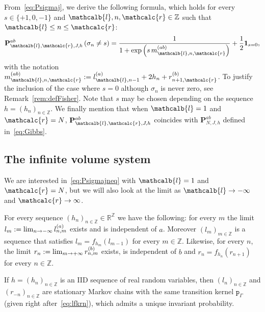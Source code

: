 \documentclass[AHL,Unicode,longabstracts,published]{cedram}
\newcommand{\ind}{\mathbf{1}}
\newcommand{\pp}{\mathtt{p}_\gG}
\newcommand{\bP}{\mathbf{P}}
\newcommand{\bbR}{\mathbb{R}}
\newcommand{\bbZ}{\mathbb{Z}}
\newcommand{\gG}{\Gamma}
\newcommand{\gs}{\sigma}
\renewcommand{\ell}{\mathcalb{l}}
\newcommand{\err}{\mathcalc{r}}
\renewcommand*{\to}{\mathchoice{\longrightarrow}{\rightarrow}{\rightarrow}{\rightarrow}}
\begin{document}
From~\eqref{eq:Psigmaj}, we derive the following formula, which holds for every $s\in\{+1, 0, -1\}$ and $\ell, n, \err \in \bbZ$ such that $\ell \le n \le \err$:
\begin{equation}\label{eq:Psigmajneq}
\bP_{ \ell, \err, J, h}^{ab}\left(\gs_n \neq s\right)=
\frac {1} {1+ \exp\left(s \, m^{(ab)}_{\ell, n, \err}\right)}+\frac12 \ind_{s=0},
\end{equation}
with the notation $m^{(ab)}_{\ell, n, \err}:=l^{(a)}_{\ell, n-1} + 2h_n+ r^{(b)}_{n+1, \err}$. To justify the inclusion of the case where $s=0$ although $\sigma_n$ is never zero, see Remark~\ref{rem:defFisher}. Note that $s$ may be chosen depending on the sequence $h=(h_n)_{n\in\bbZ}$. We finally mention that when $\ell=1$ and $\err=N$, $\bP_{ \ell, \err, J, h}^{ab}$ coincides with $\bP_{N, J, h}^{ab}$ defined in~\eqref{eq:Gibbs}.

\subsection{The infinite volume system}\label{sec:infinite_volume}

We are interested in~\eqref{eq:Psigmajneq} with $\ell=1$ and $\err=N$, but we will also look at the limit as $\ell\to -\infty$ and $\err\to \infty$.


\begin{lemm}\label{th:from-infty}
For every sequence $(h_n)_{n\in\bbZ}\in\bbR^\bbZ$ we have the following: for every $m$ the limit $l_m:= \lim_{n \to -\infty} l^{(a)}_{n, m}$ exists and is independent of $a$. Moreover $(l_m)_{m\in \bbZ}$ is a sequence that satisfies $l_{m}=f_{h_m}(l_{m-1})$ for every $m\in\bbZ$. Likewise, for every $n$, the limit $r_n:= \lim_{m \to +\infty} r^{(b)}_{n, m}$ exists, is independent of $b$ and $r_{n}=f_{h_n}(r_{n+1})$ for every $n\in\bbZ$.

If $h=(h_n)_{n \in \bbZ}$ is an IID sequence of real random variables, then $(l_n)_{n \in \bbZ}$ and $(r_{-n})_{n\in \bbZ}$ are stationary Markov chains with the same transition kernel $\pp$ (given right after~\eqref{eq:lfkrn}), which admits a unique invariant probability.
\end{lemm}
\end{document}
